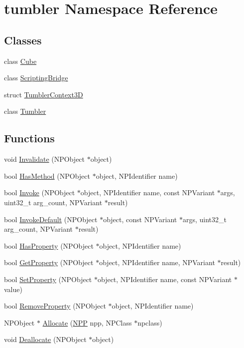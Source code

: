 \hypertarget{namespacetumbler}{
\section{tumbler Namespace Reference}
\label{namespacetumbler}
}
\subsection*{Classes}
\begin{DoxyCompactItemize}
\item 
class \hyperlink{classtumbler_1_1_cube}{Cube}
\item 
class \hyperlink{classtumbler_1_1_scripting_bridge}{ScriptingBridge}
\item 
struct \hyperlink{structtumbler_1_1_tumbler_context3_d}{TumblerContext3D}
\item 
class \hyperlink{classtumbler_1_1_tumbler}{Tumbler}
\end{DoxyCompactItemize}
\subsection*{Functions}
\begin{DoxyCompactItemize}
\item 
void \hyperlink{namespacetumbler_ab219f1f08239d2675431fd3e3299b71d}{Invalidate} (NPObject $\ast$object)
\item 
bool \hyperlink{namespacetumbler_a0440bebe4c3872dbed8390142035d1d1}{HasMethod} (NPObject $\ast$object, NPIdentifier name)
\item 
bool \hyperlink{namespacetumbler_a1336a275c5d007684384b01b032dec56}{Invoke} (NPObject $\ast$object, NPIdentifier name, const NPVariant $\ast$args, uint32\_\-t arg\_\-count, NPVariant $\ast$result)
\item 
bool \hyperlink{namespacetumbler_a35b1cc267fcf3e0beed6b9e45caa65ef}{InvokeDefault} (NPObject $\ast$object, const NPVariant $\ast$args, uint32\_\-t arg\_\-count, NPVariant $\ast$result)
\item 
bool \hyperlink{namespacetumbler_a2f2417690297eb874bfa76c0d125a64e}{HasProperty} (NPObject $\ast$object, NPIdentifier name)
\item 
bool \hyperlink{namespacetumbler_a41d6ba518f6ce31f8fafc12eb9dd044c}{GetProperty} (NPObject $\ast$object, NPIdentifier name, NPVariant $\ast$result)
\item 
bool \hyperlink{namespacetumbler_a036219547d706a1d483feb048bcacc00}{SetProperty} (NPObject $\ast$object, NPIdentifier name, const NPVariant $\ast$value)
\item 
bool \hyperlink{namespacetumbler_a4b3edf30d857d6821ff31c7676cae983}{RemoveProperty} (NPObject $\ast$object, NPIdentifier name)
\item 
NPObject $\ast$ \hyperlink{namespacetumbler_a133c46b3658a35f597bf5806a58c433e}{Allocate} (\hyperlink{struct___n_p_p}{NPP} npp, NPClass $\ast$npclass)
\item 
void \hyperlink{namespacetumbler_a6e665bba23bf978176f39f24fd07d501}{Deallocate} (NPObject $\ast$object)
\end{DoxyCompactItemize}


